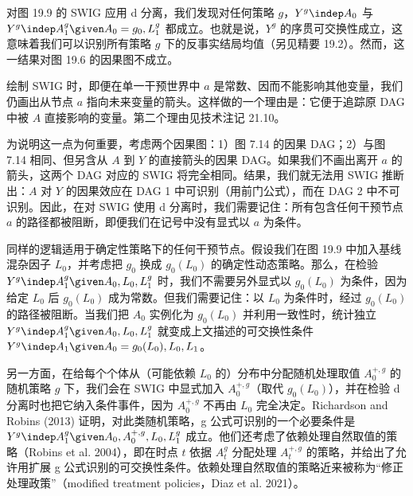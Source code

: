 对图 19.9 的 SWIG 应用 d 分离，我们发现对任何策略 $g$，$Y^g\indep A_0$ 与 $Y^g\indep A_1^g\given A_0=g_0,L_1^g$ 都成立。也就是说，$Y^g$ 的序贯可交换性成立，这意味着我们可以识别所有策略 $g$ 下的反事实结局均值（另见精要 19.2）。然而，这一结果对图 19.6 的因果图不成立。

\begin{figure}[htbp]
\centering
{}
\caption{}
\label{fig:19.10}
\end{figure}

\begin{finepoint}
绘制 SWIG 时，即便在单一干预世界中 $a$ 是常数、因而不能影响其他变量，我们仍画出从节点 $a$ 指向未来变量的箭头。这样做的一个理由是：它便于追踪原 DAG 中被 $A$ 直接影响的变量。第二个理由见技术注记 21.10。

为说明这一点为何重要，考虑两个因果图：1）图 7.14 的因果 DAG；2）与图 7.14 相同、但另含从 $A$ 到 $Y$ 的直接箭头的因果 DAG。如果我们不画出离开 $a$ 的箭头，这两个 DAG 对应的 SWIG 将完全相同。结果，我们就无法用 SWIG 推断出：$A$ 对 $Y$ 的因果效应在 DAG 1 中可识别（用前门公式），而在 DAG 2 中不可识别。因此，在对 SWIG 使用 d 分离时，我们需要记住：所有包含任何干预节点 $a$ 的路径都被阻断，即便我们在记号中没有显式以 $a$ 为条件。

同样的逻辑适用于确定性策略下的任何干预节点。假设我们在图 19.9 中加入基线混杂因子 $L_0$，并考虑把 $g_0$ 换成 $g_0(L_0)$ 的确定性动态策略。那么，在检验 $Y^g\indep A_1^g\given A_0,L_0,L_1^g$ 时，我们不需要另外显式以 $g_0(L_0)$ 为条件，因为给定 $L_0$ 后 $g_0(L_0)$ 成为常数。但我们需要记住：以 $L_0$ 为条件时，经过 $g_0(L_0)$ 的路径被阻断。当我们把 $A_0$ 实例化为 $g_0(L_0)$ 并利用一致性时，统计独立 $Y^g\indep A_1^g\given A_0,L_0,L_1^g$ 就变成上文描述的可交换性条件 $Y^g\indep A_1\given A_0=g_0(L_0),L_0,L_1$。

另一方面，在给每个个体从（可能依赖 $L_0$ 的）分布中分配随机处理取值 $A_0^{+,g}$ 的随机策略 $g$ 下，我们会在 SWIG 中显式加入 $A_0^{+,g}$（取代 $g_0(L_0)$），并在检验 d 分离时也把它纳入条件事件，因为 $A_0^{+,g}$ 不再由 $L_0$ 完全决定。Richardson and Robins (2013) 证明，对此类随机策略，g 公式可识别的一个必要条件是 $Y^g\indep A_1^g\given A_0,A_0^{+,g},L_0,L_1^g$ 成立。他们还考虑了依赖处理自然取值的策略（Robins et al. 2004），即在时点 $t$ 依据 $A_t^{g}$ 分配处理 $A_t^{+,g}$ 的策略，并给出了允许用扩展 g 公式识别的可交换性条件。依赖处理自然取值的策略近来被称为“修正处理政策”（modified treatment policies，Diaz et al. 2021）。
\end{finepoint}


